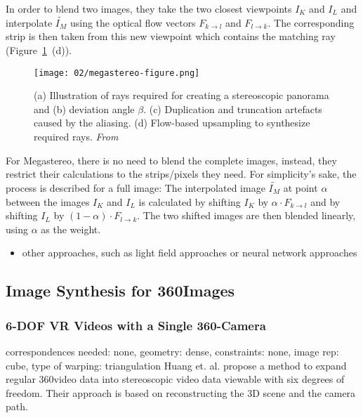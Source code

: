 In order to blend two images, they take the two closest viewpoints $I_K$ and $I_L$ and interpolate $\widetilde{I_M}$ using the optical flow vectors $F_{k\rightarrow l}$ and $F_{l\rightarrow k}$.  The corresponding strip is then taken from this new viewpoint which contains the matching ray (Figure~\ref{fig:megastereo-figure}~(d)).

\begin{figure}[]
\centering
\texttt{[image: 02/megastereo-figure.png]}
\caption[Flow-based blending in Megastereo]{(a) Illustration of rays required for creating a stereoscopic panorama and (b) deviation angle $\beta$. (c) Duplication and truncation artefacts caused by the aliasing. (d) Flow-based upsampling to synthesize required rays. \emph{From \cite{megastereo}}}
\label{fig:megastereo-figure}
\end{figure}

For Megastereo, there is no need to blend the complete images, instead, they restrict their calculations to the strips/pixels they need. For simplicity's sake, the process is described for a full image:
The interpolated image $\widetilde{I_M}$ at point $\alpha$ between the images $I_K$ and $I_L$ is calculated by shifting $I_K$ by $\alpha \cdot F_{k\rightarrow l}$ and by shifting $I_L$ by $(1 - \alpha) \cdot F_{l\rightarrow k}$. The two shifted images are then blended linearly, using $\alpha$ as the weight.

\begin{itemize}
  \item other approaches, such as light field approaches or neural network approaches
\end{itemize}

\subsection{Image Synthesis for 360\degree Images}

\subsubsection{6-DOF VR Videos with a Single 360-Camera}
correspondences needed: none, geometry: dense, constraints: none, image rep: cube, type of warping: triangulation
Huang et. al. \cite{6dof} propose a method to expand regular 360\degree video data into stereoscopic video data viewable with six degrees of freedom. Their approach is based on reconstructing the 3D scene and the camera path.

